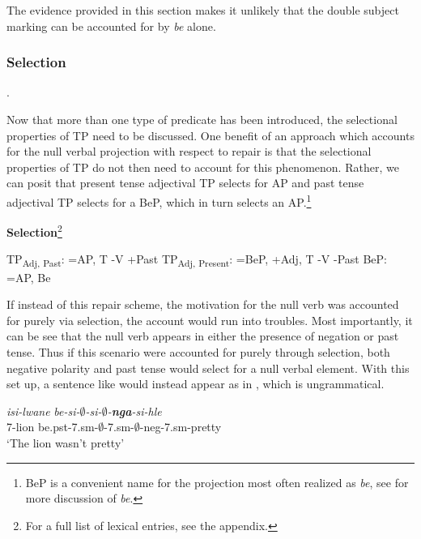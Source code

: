 \documentclass[output=paper]{langsci/langscibook}
\newcommand{\bee}[0]{\textit {be }}
\begin{document}
{\begin{exe}
\end{exe}

The evidence provided in this section makes it unlikely that the double subject marking can be accounted for by \bee alone. 



\subsubsection{Selection}. 

Now that more than one type of predicate has been introduced, the selectional properties of TP need to be discussed. One benefit of an approach which accounts for the null verbal projection with respect to repair is that the selectional properties of TP do not then need to account for this phenomenon. Rather, we can posit that present tense adjectival TP selects for AP and past tense adjectival TP selects for a BeP, which in turn selects an AP.\footnote{BeP is a convenient name for the projection most often realized as \textit{be}, see  for more discussion of \textit{be}.}


\textbf{Selection}\footnote{For a full list of lexical entries, see the appendix.}
\begin{exe}
\ex TP\textsubscript{Adj, Past}: =AP, T -V +Past
\ex TP\textsubscript{Adj, Present}: =BeP, +Adj, T -V -Past
\ex BeP: =AP, Be 
\end{exe}

If instead of this repair scheme, the motivation for the null verb was accounted for purely via selection, the account would run into troubles. Most importantly, it can be see that the null verb appears in either the presence of negation or past tense. Thus if this scenario were accounted for purely through selection, both negative polarity and past tense would select for a null verbal element. With this set up, a sentence like  would instead appear as in , which is ungrammatical.

\begin{exe}
\ex \gll *\textit{isi-lwane} \textit{be-si-$\emptyset$-si-$\emptyset$-{\bf nga}-si-hle}\\
       7-lion be.{\sc pst}-7.{\sc sm}-$\emptyset$-7.{\sc sm}-$\emptyset$-{\sc neg}-7.{\sc sm}-pretty\\
    \glt `The lion wasn't pretty' 
\end{exe}

}
\end{document}
